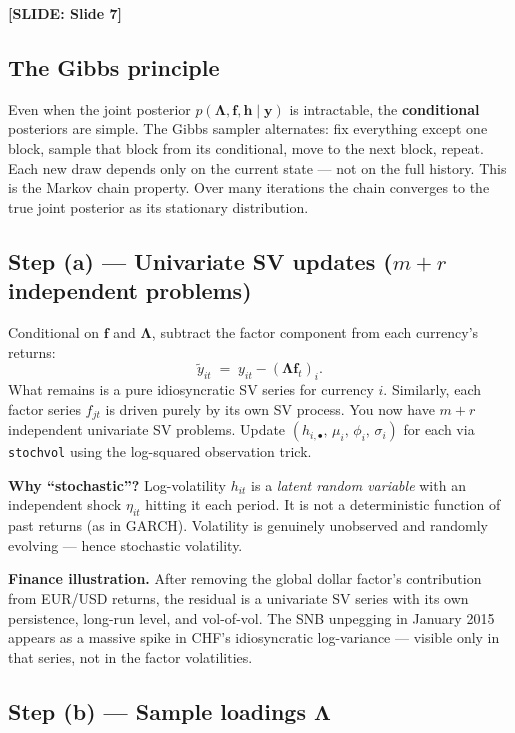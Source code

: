 \documentclass[11pt, a4paper]{article}\usepackage[]{graphicx}\usepackage[]{xcolor}
\newcommand{\slidetag}[1]{%
  \noindent\textcolor{MainBlue}{\footnotesize\textbf{[SLIDE: #1]}}%
  \vspace{0.2em}\par
}
\newcommand{\stress}[1]{\textbf{#1}}
\begin{document}
\slidetag{Slide 7}

\subsection{The Gibbs principle}

Even when the joint posterior $p(\boldsymbol{\Lambda}, \mathbf{f}, \mathbf{h}
\mid \mathbf{y})$ is intractable, the \stress{conditional} posteriors are
simple.  The Gibbs sampler alternates: fix everything except one block, sample
that block from its conditional, move to the next block, repeat.  Each new
draw depends only on the current state --- not on the full history.  This is
the Markov chain property.  Over many iterations the chain converges to the
true joint posterior as its stationary distribution.

\subsection{Step (a) --- Univariate SV updates ($m + r$ independent problems)}

Conditional on $\mathbf{f}$ and $\boldsymbol{\Lambda}$, subtract the factor
component from each currency's returns:
\[
  \tilde{y}_{it} \;=\; y_{it} - (\boldsymbol{\Lambda}\mathbf{f}_t)_i.
\]
What remains is a pure idiosyncratic SV series for currency $i$.  Similarly,
each factor series $f_{jt}$ is driven purely by its own SV process.  You now
have $m + r$ independent univariate SV problems.  Update
$(h_{i,\bullet},\, \mu_i,\, \phi_i,\, \sigma_i)$ for each via
\texttt{stochvol} using the log-squared observation trick.

\textbf{Why ``stochastic''?}  Log-volatility $h_{it}$ is a \textit{latent
random variable} with an independent shock $\eta_{it}$ hitting it each
period.  It is not a deterministic function of past returns (as in GARCH).
Volatility is genuinely unobserved and randomly evolving --- hence stochastic
volatility.

\textbf{Finance illustration.}  After removing the global dollar factor's
contribution from EUR/USD returns, the residual is a univariate SV series
with its own persistence, long-run level, and vol-of-vol.  The SNB unpegging
in January 2015 appears as a massive spike in CHF's idiosyncratic
log-variance --- visible only in that series, not in the factor volatilities.

\subsection{Step (b) --- Sample loadings $\boldsymbol{\Lambda}$}
\end{document}
